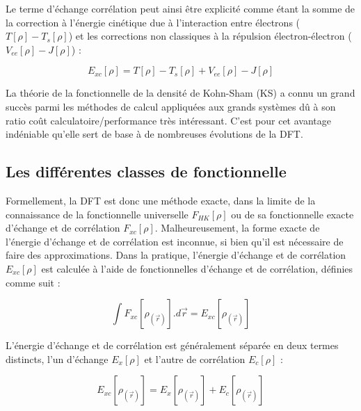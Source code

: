 	Le terme d'échange corrélation peut ainsi être explicité comme étant la somme de la correction à l'énergie cinétique due à l'interaction entre électrons ($T[\rho] - T_{s}[\rho]$) et les corrections non classiques à la répulsion électron-électron ($V_{ee}[\rho] - J[\rho]$) :
	
	\begin{equation}
	E_{xc}[\rho] = T[\rho] - T_{s}[\rho] + V_{ee}[\rho] - J[\rho]
	\end{equation}
	
	La théorie de la fonctionnelle de la densité de Kohn-Sham (KS) a connu un grand succès parmi les méthodes de calcul appliquées aux grands systèmes dû à son ratio coût calculatoire/performance très intéressant. C'est pour cet avantage indéniable qu'elle sert de base à de nombreuses évolutions de la DFT.
	
	\subsection{Les différentes classes de fonctionnelle}
	
	Formellement, la DFT est donc une méthode exacte, dans la limite de la connaissance de la fonctionnelle universelle $F_{HK}[\rho]$ ou de sa fonctionnelle exacte d’échange et de corrélation $F_{xc}[\rho]$. Malheureusement, la forme exacte de l’énergie d’échange et de corrélation est inconnue, si bien qu’il est nécessaire de faire des approximations. Dans la pratique, l’énergie d’échange et de corrélation $E_{xc}[\rho]$ est calculée à l’aide de fonctionnelles d’échange et de corrélation, définies comme suit :
	
	\begin{equation}
	\int F_{xc}[\rho_{(\vec{r})}].d\vec{r} = E_{xc}[\rho_{(\vec{r})}]
	\end{equation}
	
	L’énergie d’échange et de corrélation est généralement séparée en deux termes distincts, l’un d’échange $E_{x}[\rho]$ et l’autre de corrélation $E_{c}[\rho]$ :
	
	\begin{equation}
	E_{xc}[\rho_{(\vec{r})}] = E_{x}[\rho_{(\vec{r})}] + E_{c}[\rho_{(\vec{r})}]
	\end{equation}
	
